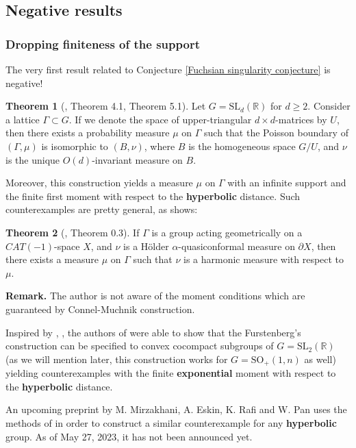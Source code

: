 \documentclass[11pt]{amsart}
\theoremstyle{definition}
\newtheorem{theorem}{Theorem}[section]
\begin{document}
	\subsection{Negative results}
	\subsubsection{Dropping finiteness of the support}
	The very first result related to Conjecture \ref{Fuchsian singularity conjecture} is negative!
	
	\begin{theorem}[\cite{furstenberg71}, Theorem 4.1, Theorem 5.1]
		Let $G = \mathrm{SL}_d(\mathbb{R})$ for $d \ge 2$. Consider a lattice $\Gamma \subset G$. If we denote the space of upper-triangular $d \times d$-matrices by $U$, then there exists a probability measure $\mu$ on $\Gamma$ such that the Poisson boundary of $(\Gamma, \mu)$ is isomorphic to $(B, \nu)$, where $B$ is the homogeneous space $G / U$, and $\nu$ is the unique $O(d)$-invariant measure on $B$. 
	\end{theorem} 
	
	Moreover, this construction yields a measure $\mu$ on $\Gamma$ with an infinite support and the finite first moment with respect to the \textbf{hyperbolic} distance. Such counterexamples are pretty general, as \cite{connelmuchnik} shows:
	
	\begin{theorem}[\cite{connelmuchnik}, Theorem 0.3]
		If $\Gamma$ is a group acting geometrically on a $CAT(-1)$-space $X$, and $\nu$ is a H\"{o}lder $\alpha$-quasiconformal measure on $\partial X$, then there exists a measure $\mu$ on $\Gamma$ such that $\nu$ is a harmonic measure with respect to $\mu$.
	\end{theorem}
	\textbf{Remark.} The author is not aware of the moment conditions which are guaranteed by Connel-Muchnik construction.
	
	Inspired by \cite{furstenberg71}, \cite{connelmuchnik}, the authors of \cite{linaudpan} were able to show that the Furstenberg's construction can be specified to convex cocompact subgroups of $G = \text{SL}_2(\mathbb{R})$ (as we will mention later, this construction works for $G = \text{SO}_+(1, n)$ as well) yielding counterexamples with the finite \textbf{exponential} moment with respect to the \textbf{hyperbolic} distance.
	
	An upcoming preprint by M. Mirzakhani, A. Eskin, K. Rafi and W. Pan uses the methods of \cite{connelmuchnik} in order to construct a similar counterexample for any \textbf{hyperbolic} group. As of May 27, 2023, it has not been announced yet.
	
\end{document}
